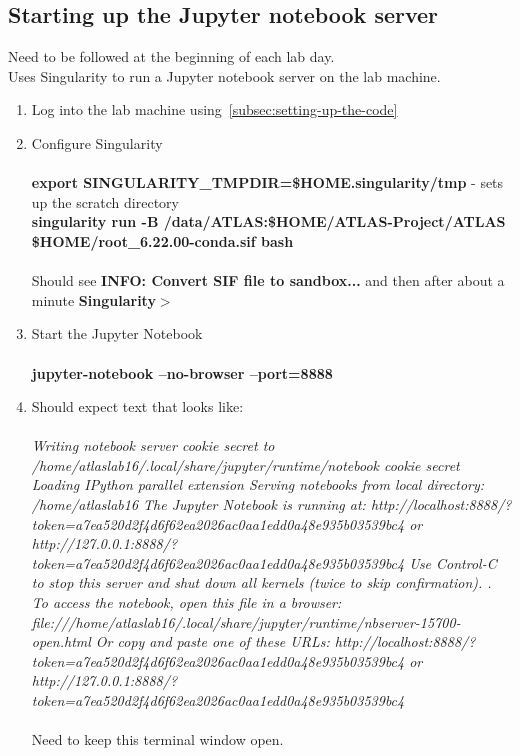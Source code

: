 \subsection{Starting up the Jupyter notebook server}
Need to be followed at the beginning of each lab day.\\
Uses Singularity to run a Jupyter notebook server on the lab machine.
\begin{enumerate}
    \item Log into the lab machine using~\ref{subsec:setting-up-the-code}

    \item Configure Singularity
    \\\\
    \textbf{export SINGULARITY\_TMPDIR=\$HOME\/.singularity/tmp} - sets up the scratch directory
    \\
    \textbf{singularity run -B /data/ATLAS:\$HOME/ATLAS-Project/ATLAS \$HOME/root\_6.22.00-conda.sif bash}
    \\\\
    Should see \textbf{INFO: Convert SIF file to sandbox...} and then after about a minute \textbf{Singularity$>$}

    \item Start the Jupyter Notebook
    \\\\
    \textbf{jupyter-notebook --no-browser --port=8888}
    
    \item Should expect text that looks like:
    \\\\
    \textit{Writing notebook server cookie secret to /home/atlaslab16/.local/share/jupyter/runtime/notebook cookie secret
    Loading IPython parallel extension
    Serving notebooks from local directory: /home/atlaslab16
    The Jupyter Notebook is running at: http://localhost:8888/?token=a7ea520d2f4d6f62ea2026ac0aa1edd0a48e935b03539bc4 or http://127.0.0.1:8888/?token=a7ea520d2f4d6f62ea2026ac0aa1edd0a48e935b03539bc4 Use Control-C to stop this server and shut down all kernels (twice to skip confirmation).
    .
    To access the notebook, open this file in a browser: file:///home/atlaslab16/.local/share/jupyter/runtime/nbserver-15700-open.html Or copy and paste one of these URLs: http://localhost:8888/?token=a7ea520d2f4d6f62ea2026ac0aa1edd0a48e935b03539bc4 or http://127.0.0.1:8888/?token=a7ea520d2f4d6f62ea2026ac0aa1edd0a48e935b03539bc4}
    \\\\
    Need to keep this terminal window open.
    

\end{enumerate}
